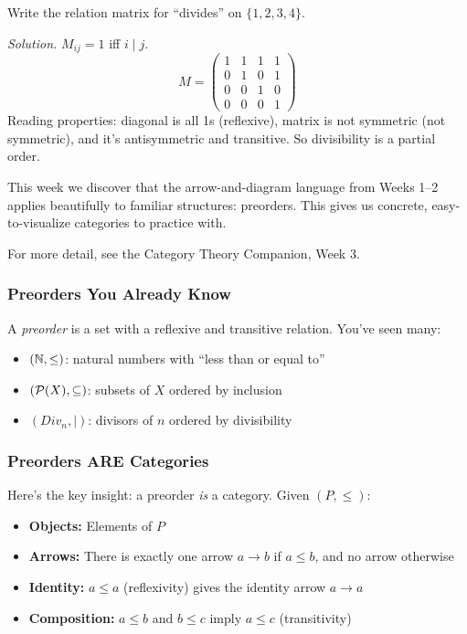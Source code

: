 \begin{example}
Write the relation matrix for ``divides'' on $\{1, 2, 3, 4\}$.

\emph{Solution.} $M_{ij} = 1$ iff $i \mid j$.
\[
M = \begin{pmatrix}
1 & 1 & 1 & 1 \\
0 & 1 & 0 & 1 \\
0 & 0 & 1 & 0 \\
0 & 0 & 0 & 1
\end{pmatrix}
\]
Reading properties: diagonal is all 1s (reflexive), matrix is not symmetric (not symmetric), and it's antisymmetric and transitive. So divisibility is a partial order.
\end{example}

\begin{goingdeeper}
This week we discover that the arrow-and-diagram language from Weeks 1--2 applies beautifully to familiar structures: preorders. This gives us concrete, easy-to-visualize categories to practice with.

For more detail, see the Category Theory Companion, Week 3.

\subsubsection*{Preorders You Already Know}

A \emph{preorder} is a set with a reflexive and transitive relation. You've seen many:
\begin{itemize}
  \item $(\mathbb{N}, \leq)$: natural numbers with ``less than or equal to''
  \item $(\mathcal{P}(X), \subseteq)$: subsets of $X$ ordered by inclusion
  \item $(Div_n, \mid)$: divisors of $n$ ordered by divisibility
\end{itemize}

\subsubsection*{Preorders ARE Categories}

Here's the key insight: a preorder \emph{is} a category. Given $(P, \leq)$:
\begin{itemize}
  \item \textbf{Objects:} Elements of $P$
  \item \textbf{Arrows:} There is exactly one arrow $a \to b$ if $a \leq b$, and no arrow otherwise
  \item \textbf{Identity:} $a \leq a$ (reflexivity) gives the identity arrow $a \to a$
  \item \textbf{Composition:} $a \leq b$ and $b \leq c$ imply $a \leq c$ (transitivity)
\end{itemize}


\end{goingdeeper}
